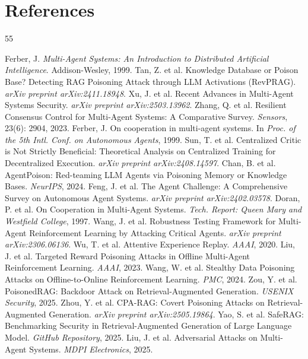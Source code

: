 \documentclass[conference]{IEEEtran}
\begin{document}
\balance
\clearpage
\section*{References}
\begin{thebibliography}{55}

 Ferber, J. \emph{Multi-Agent Systems: An Introduction to Distributed Artificial Intelligence}. Addison-Wesley, 1999.
 Tan, Z. et al. Knowledge Database or Poison Base? Detecting RAG Poisoning Attack through LLM Activations (RevPRAG). \emph{arXiv preprint arXiv:2411.18948}.
 Xu, J. et al. Recent Advances in Multi-Agent Systems Security. \emph{arXiv preprint arXiv:2503.13962}.
 Zhang, Q. et al. Resilient Consensus Control for Multi-Agent Systems: A Comparative Survey. \emph{Sensors}, 23(6): 2904, 2023.
 Ferber, J. On cooperation in multi-agent systems. In \emph{Proc. of the 5th Intl. Conf. on Autonomous Agents}, 1999.
 Sun, T. et al. Centralized Critic is Not Strictly Beneficial: Theoretical Analysis on Centralized Training for Decentralized Execution. \emph{arXiv preprint arXiv:2408.14597}.
 Chan, B. et al. AgentPoison: Red-teaming LLM Agents via Poisoning Memory or Knowledge Bases. \emph{NeurIPS}, 2024.
 Feng, J. et al. The Agent Challenge: A Comprehensive Survey on Autonomous Agent Systems. \emph{arXiv preprint arXiv:2402.03578}.
 Doran, P. et al. On Cooperation in Multi-Agent Systems. \emph{Tech. Report: Queen Mary and Westfield College}, 1997.
 Wang, J. et al. Robustness Testing Framework for Multi-Agent Reinforcement Learning by Attacking Critical Agents. \emph{arXiv preprint arXiv:2306.06136}.
 Wu, T. et al. Attentive Experience Replay. \emph{AAAI}, 2020.
 Liu, J. et al. Targeted Reward Poisoning Attacks in Offline Multi-Agent Reinforcement Learning. \emph{AAAI}, 2023.
 Wang, W. et al. Stealthy Data Poisoning Attacks on Offline-to-Online Reinforcement Learning. \emph{PMC}, 2024.
 Zou, Y. et al. PoisonedRAG: Backdoor Attack on Retrieval-Augmented Generation. \emph{USENIX Security}, 2025.
 Zhou, Y. et al. CPA-RAG: Covert Poisoning Attacks on Retrieval-Augmented Generation. \emph{arXiv preprint arXiv:2505.19864}.
 Yao, S. et al. SafeRAG: Benchmarking Security in Retrieval-Augmented Generation of Large Language Model. \emph{GitHub Repository}, 2025.
 Liu, J. et al. Adversarial Attacks on Multi-Agent Systems. \emph{MDPI Electronics}, 2025.

\end{thebibliography}
\end{document}

